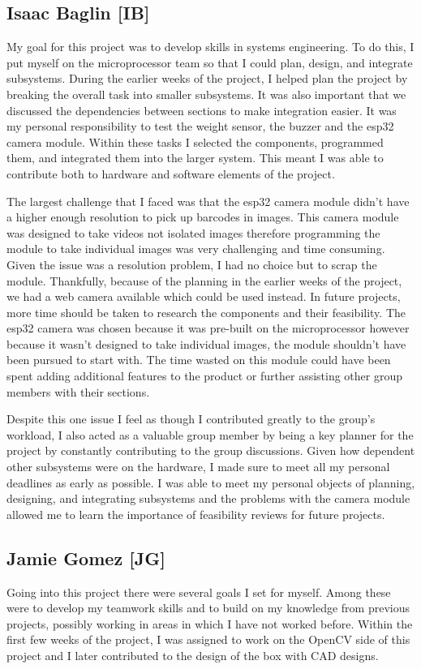 \subsection{Isaac Baglin [IB]}
My goal for this project was to develop skills in systems engineering.
To do this, I put myself on the microprocessor team so that I could plan, design, and integrate subsystems.
During the earlier weeks of the project, I helped plan the project by breaking the overall task into smaller subsystems.
It was also important that we discussed the dependencies between sections to make integration easier.
It was my personal responsibility to test the weight sensor, the buzzer and the esp32 camera module.
Within these tasks I selected the components, programmed them, and integrated them into the larger system.
This meant I was able to contribute both to hardware and software elements of the project.

The largest challenge that I faced was that the esp32 camera module didn't have a higher enough resolution to pick up barcodes in images.
This camera module was designed to take videos not isolated images therefore programming the module to take individual images was very challenging and time consuming.
Given the issue was a resolution problem, I had no choice but to scrap the module.
Thankfully, because of the planning in the earlier weeks of the project, we had a web camera available which could be used instead.
In future projects, more time should be taken to research the components and their feasibility.
The esp32 camera was chosen because it was pre-built on the microprocessor however because it wasn't designed to take individual images, the module shouldn't have been pursued to start with.
The time wasted on this module could have been spent adding additional features to the product or further assisting other group members with their sections.

Despite this one issue I feel as though I contributed greatly to the group's workload, I also acted as a valuable group member by being a key planner for the project by constantly contributing to the group discussions.
Given how dependent other subsystems were on the hardware, I made sure to meet all my personal deadlines as early as possible.
I was able to meet my personal objects of planning, designing, and integrating subsystems and the problems with the camera module allowed me to learn the importance of feasibility reviews for future projects.

\subsection{Jamie Gomez [JG]}
Going into this project there were several goals I set for myself.
Among these were to develop my teamwork skills and to build on my knowledge from previous projects, possibly working in areas in which I have not worked before.
Within the first few weeks of the project, I was assigned to work on the OpenCV side of this project and I later contributed to the design of the box with CAD designs.

